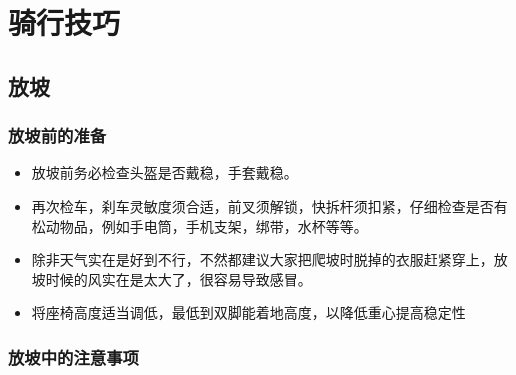 \documentclass{ctexbook}
\begin{document}
\chapter{骑行技巧}
\section{放坡}
\subsection{放坡前的准备}
\begin{itemize}
    \item 放坡前务必检查头盔是否戴稳，手套戴稳。
    \item 再次检车，刹车灵敏度须合适，前叉须解锁，快拆杆须扣紧，仔细检查是否有松动物品，例如手电筒，手机支架，绑带，水杯等等。
    \item 除非天气实在是好到不行，不然都建议大家把爬坡时脱掉的衣服赶紧穿上，放坡时候的风实在是太大了，很容易导致感冒。
    \item 将座椅高度适当调低，最低到双脚能着地高度，以降低重心提高稳定性
\end{itemize}
\subsection{放坡中的注意事项}
\end{document}
